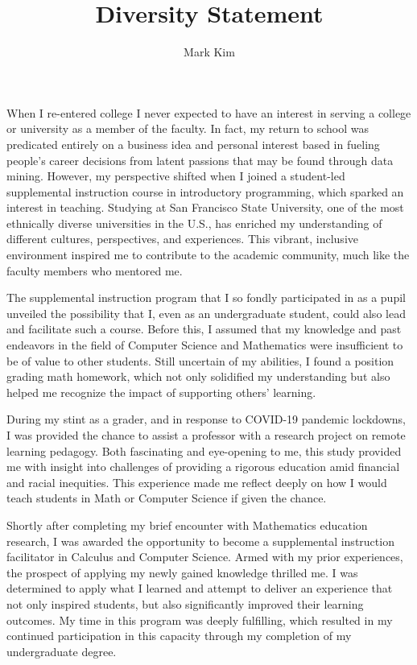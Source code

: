 \documentclass[12pt]{article}
\title{Diversity Statement}
\author{Mark Kim}
\begin{document}
\maketitle

When I re-entered college I never expected to have an interest in serving a college or university as a member of the faculty.  In fact, my
return to school was predicated entirely on a business idea and personal interest based in fueling people's career decisions from latent
passions that may be found through data mining.  However, my perspective shifted when I joined a student-led supplemental instruction course
in introductory programming, which sparked an interest in teaching.  Studying at San Francisco State University, one of the most ethnically
diverse universities in the U.S., has enriched my understanding of different cultures, perspectives, and experiences. This vibrant,
inclusive environment inspired me to contribute to the academic community, much like the faculty members who mentored me.

The supplemental instruction program that I so fondly participated in as a pupil unveiled the possibility that I, even as an undergraduate
student, could also lead and facilitate such a course.  Before this, I assumed that my knowledge and past endeavors in the field of Computer
Science and Mathematics were insufficient to be of value to other students.  Still uncertain of my abilities, I found a position grading
math homework, which not only solidified my understanding but also helped me recognize the impact of supporting others' learning.

During my stint as a grader, and in response to COVID-19 pandemic lockdowns, I was provided the chance to assist a professor with a research
project on remote learning pedagogy.  Both fascinating and eye-opening 
to me, this study provided me with insight into challenges of providing a rigorous education amid financial and racial inequities.  This
experience made me reflect deeply on how I would teach students in Math or Computer Science if given the chance.

Shortly after completing my brief encounter with Mathematics education research,
I was awarded the opportunity to become a supplemental instruction facilitator
in Calculus and Computer Science.  Armed with my prior experiences, the prospect of applying my newly
gained knowledge thrilled me.  I was determined to apply what I learned and attempt to
deliver an experience that not only inspired students, but also significantly
improved their learning outcomes.  My time in this program was deeply fulfilling, which
resulted in my continued participation in this capacity through my completion of
my undergraduate degree.
\end{document}
